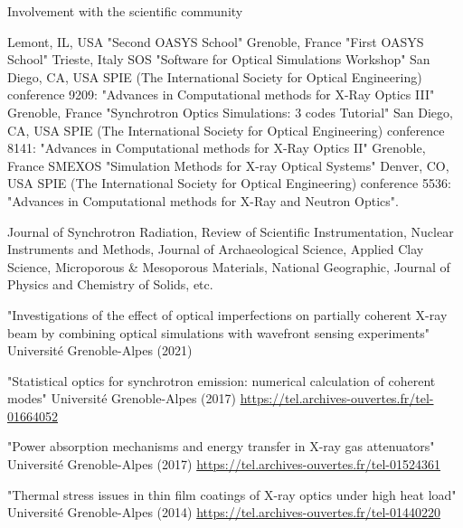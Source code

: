 \begin{rubric}{Involvement with the scientific community}

\entry*[2019/12] Lemont, IL, USA "Second OASYS School"
\entry*[2019/05] Grenoble, France "First OASYS School"
\entry*[2016] Trieste, Italy SOS "Software for Optical Simulations Workshop"
\entry*[2014] San Diego, CA, USA SPIE (The International Society for Optical Engineering) conference 9209: "Advances in Computational methods for X-Ray Optics III"
\entry*[2013] Grenoble, France "Synchrotron Optics Simulations: 3 codes Tutorial"
\entry*[2011] San Diego, CA, USA SPIE (The International Society for Optical Engineering) conference 8141: "Advances in Computational methods for X-Ray Optics II"
\entry*[2009] Grenoble, France SMEXOS "Simulation Methods for X-ray Optical Systems"
\entry*[2004] Denver, CO, USA SPIE (The International Society for Optical Engineering) conference 5536: "Advances in Computational methods for X-Ray and Neutron Optics".

\entry*[] Journal of Synchrotron Radiation, Review of Scientific Instrumentation, Nuclear Instruments and Methods,  Journal of Archaeological Science, Applied Clay Science, Microporous \& Mesoporous Materials, National Geographic, Journal of Physics and Chemistry of Solids, etc.

 "Investigations of the effect of optical imperfections on partially coherent X-ray beam by combining optical simulations with wavefront sensing experiments" Universit\'e Grenoble-Alpes (2021)

 "Statistical optics for synchrotron emission: numerical calculation of coherent modes" Universit\'e Grenoble-Alpes (2017) 
{
\url{https://tel.archives-ouvertes.fr/tel-01664052}}

 "Power absorption mechanisms and energy transfer in X-ray gas attenuators" Universit\'e Grenoble-Alpes (2017) \url{https://tel.archives-ouvertes.fr/tel-01524361}

 "Thermal stress issues in thin film coatings of X-ray optics under high heat load" Universit\'e Grenoble-Alpes (2014) \url{https://tel.archives-ouvertes.fr/tel-01440220}


\end{rubric}
